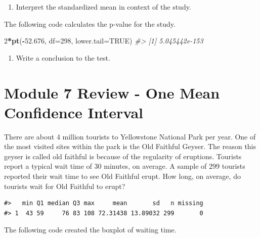 \documentclass[
]{report}
\newenvironment{Shaded}{\begin{snugshade}}{\end{snugshade}}
\newcommand{\AttributeTok}[1]{\textcolor[rgb]{0.13,0.29,0.53}{#1}}
\newcommand{\CommentTok}[1]{\textcolor[rgb]{0.56,0.35,0.01}{\textit{#1}}}
\newcommand{\ConstantTok}[1]{\textcolor[rgb]{0.56,0.35,0.01}{#1}}
\newcommand{\DecValTok}[1]{\textcolor[rgb]{0.00,0.00,0.81}{#1}}
\newcommand{\FloatTok}[1]{\textcolor[rgb]{0.00,0.00,0.81}{#1}}
\newcommand{\FunctionTok}[1]{\textcolor[rgb]{0.13,0.29,0.53}{\textbf{#1}}}
\newcommand{\NormalTok}[1]{#1}
\newcommand{\SpecialCharTok}[1]{\textcolor[rgb]{0.81,0.36,0.00}{\textbf{#1}}}
\providecommand{\tightlist}{%
  \setlength{\itemsep}{0pt}\setlength{\parskip}{0pt}}
\begin{document}
\begin{enumerate}
\def\labelenumi{\arabic{enumi}.}
\setcounter{enumi}{13}
\tightlist
\item
  Interpret the standardized mean in context of the study.
  \vspace{1in}
\end{enumerate}

The following code calculates the p-value for the study.

\begin{Shaded}
\begin{Highlighting}[]
\DecValTok{2}\SpecialCharTok{*}\FunctionTok{pt}\NormalTok{(}\SpecialCharTok{{-}}\FloatTok{52.676}\NormalTok{, }\AttributeTok{df=}\DecValTok{298}\NormalTok{, }\AttributeTok{lower.tail=}\ConstantTok{TRUE}\NormalTok{)}
\CommentTok{\#\textgreater{} [1] 5.045442e{-}153}
\end{Highlighting}
\end{Shaded}

\begin{enumerate}
\def\labelenumi{\arabic{enumi}.}
\setcounter{enumi}{14}
\tightlist
\item
  Write a conclusion to the test.
\end{enumerate}

\vspace{1in}

\newpage

\section{Module 7 Review - One Mean Confidence Interval}\label{module-7-review---one-mean-confidence-interval}

There are about 4 million tourists to Yellowstone National Park per year. One of the most visited sites within the park is the Old Faithful Geyser. The reason this geyser is called old faithful is because of the regularity of eruptions. Tourists report a typical wait time of 30 minutes, on average. A sample of 299 tourists reported their wait time to see Old Faithful erupt. How long, on average, do tourists wait for Old Faithful to erupt?

\begin{verbatim}
#>   min Q1 median Q3 max     mean       sd   n missing
#> 1  43 59     76 83 108 72.31438 13.89032 299       0
\end{verbatim}

The following code created the boxplot of waiting time.
\end{document}
